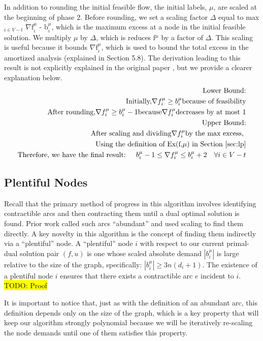\documentclass{article}
\newcommand{\todo}[1]{\colorbox{yellow}{TODO: #1}}
\begin{document}
    In addition to rounding the initial feasible flow, the initial labels, $\mu$, are scaled at the beginning of phase 2. Before rounding, we set a scaling factor $\Delta$ equal to max$_{i \in V -t}$ $\nabla$f$_i^\mu$ - b$_i^\mu$, which is the maximum excess at a node in the initial feasible solution. We multiply $\mu$ by $\Delta$, which is reduces f$^\mu$ by a factor of $\Delta$. This scaling is useful because it bounds $\nabla$f$_i^\mu$, which is used to bound the total excess in the amortized analysis (explained in Section 5.8). The derivation leading to this result is not explicitly explained in the original paper \cite{Olver2017}, but we provide a clearer explanation below.
    \begin{align*}
    	\text{Lower Bound:} \\
    	\text{Initially,} \nabla f_i^\mu \geq b_i^\mu \text{because of feasibility} \\
        \text{After rounding,} \nabla f_i^\mu \geq b_i^\mu - 1 \text{because} \nabla f_i^\mu \text{decreases by at most 1} \\
        \text{Upper Bound:} \\
        \text{After scaling and dividing} \nabla f_i^\mu \text{by the max excess, } \\
        \text{Using the definition of Ex(f,$\mu$) in Section~\ref{sec:lp}} \\
        \text{Therefore, we have the final result: } \quad
    	b_i^\mu - 1 \leq \nabla f_i^\mu \leq b_i^\mu + 2 \quad \forall i \in V-t 
    \end{align*}
 
    
    \subsection{Plentiful Nodes}
Recall that the primary method of progress in this algorithm involves identifying contractible arcs and then contracting them until a dual optimal solution is found. Prior work called such arcs ``abundant'' and used scaling to find them directly. A key novelty in this algorithm is the concept of finding them indirectly via a ``plentiful'' node. A ``plentiful'' node $i$ with respect to our current primal-dual solution pair $(f,u)$ is one whose scaled absolute demand $|b_i^{\mu}|$ is large relative to the size of the graph, specifically: $|b_i^{\mu}| \ge 3n(d_i + 1)$. The existence of a plentiful node $i$ ensures that there exists a contractible arc $e$ incident to $i$. \todo{Proof}

It is important to notice that, just as with the definition of an abundant  arc, this definition depends only on the size of the graph, which is a key property that will keep our algorithm strongly polynomial because we will be iteratively re-scaling the node demands until one of them satisfies this property.
\end{document}
